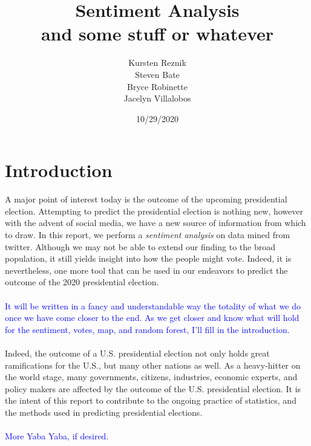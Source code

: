 \documentclass[11pt, oneside]{article}
\title{Sentiment Analysis\\
\small{and some stuff or whatever}
}
\author{\hspace{1.5cm}\parbox[t][2.5cm][t]{4cm}{
	Kursten Reznik\\
	Steven Bate
}
\parbox[t][2.5cm][t]{4cm}{
	Bryce Robinette\\
	Jacelyn Villalobos
}
}
\date{10/29/2020}
\begin{document}
\maketitle

\pagebreak

\tableofcontents


\section{Introduction}
A major point of interest today is the outcome of the upcoming presidential election. Attempting to predict the presidential election is nothing new, however with the advent of social media, we have a new source of information from which to draw. In this report, we perform a \emph{sentiment analysis} on data mined from twitter. Although we may not be able to extend our finding to the broad population, it still yields insight into how the people might vote. Indeed, it is nevertheless, one more tool that can be used in our endeavors to predict the outcome of the 2020 presidential election.\\
\\
\textcolor{blue}{It will be written in a fancy and understandable way the totality of what we do once we have come closer to the end. As we get closer and know what will hold for the sentiment, votes, map, and random forest, I'll fill in the introduction.}\\
\\
Indeed, the outcome of a U.S. presidential election not only holds great ramifications for the U.S., but many other nations as well. As a heavy-hitter on the world stage, many governments, citizens, industries, economic experts, and policy makers are affected by the outcome of the U.S. presidential election. It is the intent of this report to contribute to the ongoing practice of statistics, and the methods used in predicting presidential elections.\\
\\
\textcolor{blue}{More Yaba Yaba, if desired.}\\ 
\end{document}
